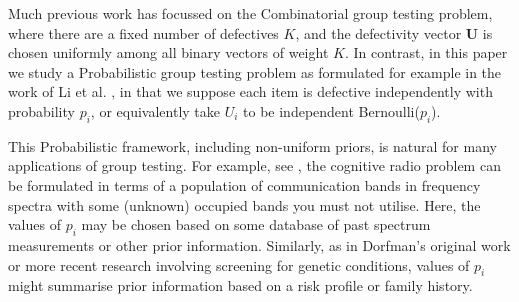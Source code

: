 \documentclass[conference]{IEEEtran}
\newcommand{\vc}[1]{{\mathbf{ #1}}}
\begin{document}
Much previous work has focussed on the Combinatorial group testing problem, where there are a fixed number of defectives $K$, and the defectivity vector $\vc{U}$ is chosen uniformly among all
binary vectors of weight $K$. In contrast, in this paper we study a Probabilistic group testing problem as formulated
for example in the work of Li et al. \cite{li5}, in that we suppose 
 each item is defective  independently with probability \(p_i\), or equivalently take $U_i$ to be independent Bernoulli($p_i$).

This Probabilistic framework, including non-uniform priors, is natural for many applications of group testing.
For example, see \cite{atia2}, the cognitive radio problem can be formulated in terms of  a population
 of communication bands in frequency spectra with some (unknown) occupied bands you must not utilise. Here, the values of $p_i$ may be chosen
 based on some database of past spectrum measurements or other prior information. Similarly, as in Dorfman's original work  \cite{dorfman} or more recent 
research \cite{shental} involving screening for genetic conditions, values of
$p_i$ might summarise prior information based on a risk profile or  family history.
%
\end{document}
